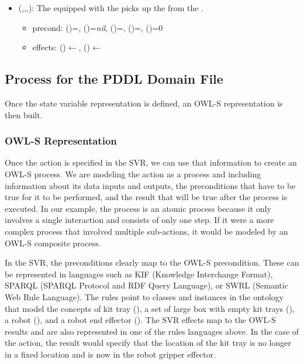 \begin{itemize}
\item {}(,,,): The   equipped with the   picks up the   from the  .
\begin{itemize}
\item precond: ()=, ()=\textit{nil}, ()=, ()=, ()=0
\item effects: ()$\leftarrow$, ()$\leftarrow$
\end{itemize}
\end{itemize}




\subsection{Process for the PDDL Domain File}
\label{subsect:PDDL_Domain_File}
Once the state variable representation is defined, an OWL-S representation is then built. 

\subsubsection{OWL-S Representation}
Once the action is specified in the SVR, we can use that information to create an OWL-S process. We are modeling the action as a process and including information about its data inputs and outputs, the preconditions that have to be true for it to be performed, and the result that will be true after the process is executed. In our example, the process is an atomic process because it only involves a single interaction and consists of only one step. If it were a more complex process that involved multiple sub-actions, it would be modeled by an OWL-S composite process.

In the SVR, the preconditions clearly map to the OWL-S precondition. These can be represented in languages such as KIF \cite{KIF} (Knowledge Interchange Format), SPARQL \cite{SPARQL} (SPARQL Protocol and RDF Query Language), or SWRL \cite{SWRL-W3C} (Semantic Web Rule Language). The rules point to classes and instances in the ontology that model the concepts of kit tray (), a set of large box with empty kit trays (), a robot (), and a robot end effector (). The SVR effects map to the OWL-S results and are also represented in one of the rules languages above. In the case of the  action, the result would specify that the location of the kit tray is no longer in a fixed location and is now in the robot gripper effector.

